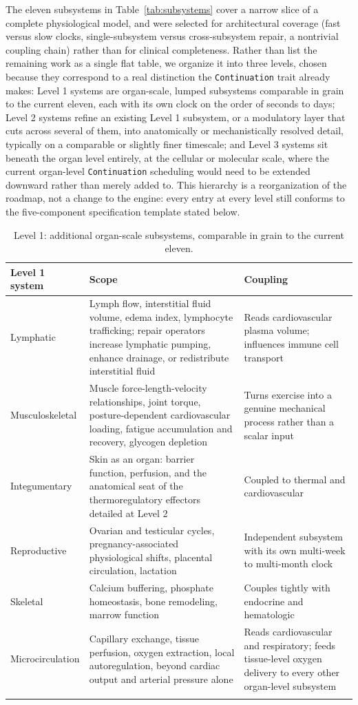 \documentclass[11pt]{article}
\begin{document}
The eleven subsystems in Table~\ref{tab:subsystems} cover a narrow slice of a complete physiological model, and were selected for architectural coverage (fast versus slow clocks, single-subsystem versus cross-subsystem repair, a nontrivial coupling chain) rather than for clinical completeness. Rather than list the remaining work as a single flat table, we organize it into three levels, chosen because they correspond to a real distinction the \texttt{Continuation} trait already makes: Level 1 systems are organ-scale, lumped subsystems comparable in grain to the current eleven, each with its own clock on the order of seconds to days; Level 2 systems refine an existing Level 1 subsystem, or a modulatory layer that cuts across several of them, into anatomically or mechanistically resolved detail, typically on a comparable or slightly finer timescale; and Level 3 systems sit beneath the organ level entirely, at the cellular or molecular scale, where the current organ-level \texttt{Continuation} scheduling would need to be extended downward rather than merely added to. This hierarchy is a reorganization of the roadmap, not a change to the engine: every entry at every level still conforms to the five-component specification template stated below.

\begin{longtable}{@{}p{2.6cm}p{7.3cm}p{2.8cm}@{}}
\toprule
Level 1 system & Scope & Coupling \\
\midrule
\endhead
Lymphatic & Lymph flow, interstitial fluid volume, edema index, lymphocyte trafficking; repair operators increase lymphatic pumping, enhance drainage, or redistribute interstitial fluid & Reads cardiovascular plasma volume; influences immune cell transport \\
Musculoskeletal & Muscle force-length-velocity relationships, joint torque, posture-dependent cardiovascular loading, fatigue accumulation and recovery, glycogen depletion & Turns exercise into a genuine mechanical process rather than a scalar input \\
Integumentary & Skin as an organ: barrier function, perfusion, and the anatomical seat of the thermoregulatory effectors detailed at Level 2 & Coupled to thermal and cardiovascular \\
Reproductive & Ovarian and testicular cycles, pregnancy-associated physiological shifts, placental circulation, lactation & Independent subsystem with its own multi-week to multi-month clock \\
Skeletal & Calcium buffering, phosphate homeostasis, bone remodeling, marrow function & Couples tightly with endocrine and hematologic \\
Microcirculation & Capillary exchange, tissue perfusion, oxygen extraction, local autoregulation, beyond cardiac output and arterial pressure alone & Reads cardiovascular and respiratory; feeds tissue-level oxygen delivery to every other organ-level subsystem \\
\bottomrule
\caption{Level 1: additional organ-scale subsystems, comparable in grain to the current eleven.}
\label{tab:roadmap-l1}
\end{longtable}
\end{document}
